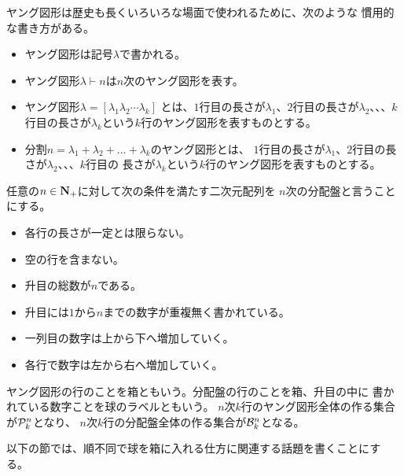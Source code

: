 	ヤング図形は歴史も長くいろいろな場面で使われるために、次のような
	慣用的な書き方がある。
	\begin{itemize}\setlength{\itemsep}{-1mm} %
		\item ヤング図形は記号$\lambda$で書かれる。
		\item ヤング図形$\lambda\vdash n$は$n$次のヤング図形を表す。
		\item ヤング図形$\lambda=[\lambda_1\lambda_2\cdots\lambda_k]$
		とは、$1$行目の長さが$\lambda_1$、$2$行目の長さが$\lambda_2$、、、$k$
		行目の長さが$\lambda_k$という$k$行のヤング図形を表すものとする。
		\item 分割$n=\lambda_1+\lambda_2+\dots+\lambda_k$のヤング図形とは、
		$1$行目の長さが$\lambda_1$、$2$行目の長さが$\lambda_2$、、、$k$行目の
		長さが$\lambda_k$という$k$行のヤング図形を表すものとする。
	\end{itemize} %

	\begin{definition}[分配盤]\label{def:分配盤} %
		任意の$n\in{\ensuremath{\mathbf{N}}}_+$に対して次の条件を満たす二次元配列を
		$n$次の分配盤と言うことにする。
		\begin{itemize}\setlength{\itemsep}{-1mm} %
			\item 各行の長さが一定とは限らない。
			\item 空の行を含まない。
			\item 升目の総数が$n$である。
			\item 升目には$1$から$n$までの数字が重複無く書かれている。
			\item 一列目の数字は上から下へ増加していく。
			\item 各行で数字は左から右へ増加していく。
		\end{itemize} %
	\end{definition} %

	ヤング図形の行のことを箱ともいう。分配盤の行のことを箱、升目の中に
	書かれている数字ことを球のラベルともいう。
	$n$次$k$行のヤング図形全体の作る集合が${{\mathcal{P}}}_k^n$となり、
	$n$次$k$行の分配盤全体の作る集合が${{\mathcal{B}}}_k^n$となる。

	以下の節では、順不同で球を箱に入れる仕方に関連する話題を書くことにする。
	
